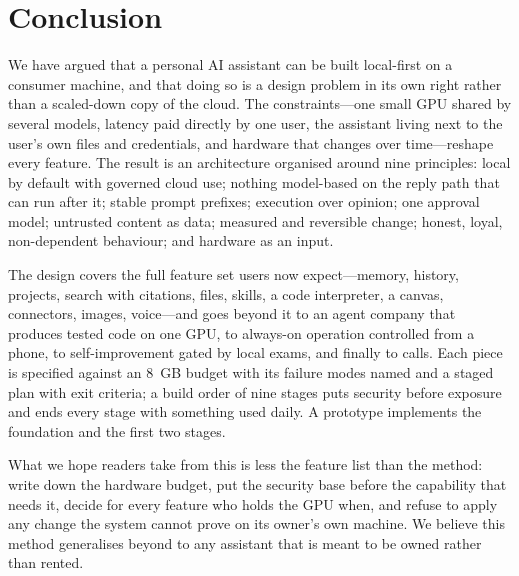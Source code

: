 \section{Conclusion}
\label{sec:conclusion}

We have argued that a personal AI assistant can be built local-first on a consumer machine, and that doing so is a design problem in its own right rather than a scaled-down copy of the cloud. The constraints---one small GPU shared by several models, latency paid directly by one user, the assistant living next to the user's own files and credentials, and hardware that changes over time---reshape every feature. The result is an architecture organised around nine principles: local by default with governed cloud use; nothing model-based on the reply path that can run after it; stable prompt prefixes; execution over opinion; one approval model; untrusted content as data; measured and reversible change; honest, loyal, non-dependent behaviour; and hardware as an input.

The design covers the full feature set users now expect---memory, history, projects, search with citations, files, skills, a code interpreter, a canvas, connectors, images, voice---and goes beyond it to an agent company that produces tested code on one GPU, to always-on operation controlled from a phone, to self-improvement gated by local exams, and finally to calls. Each piece is specified against an 8~GB budget with its failure modes named and a staged plan with exit criteria; a build order of nine stages puts security before exposure and ends every stage with something used daily. A prototype implements the foundation and the first two stages.

What we hope readers take from this is less the feature list than the method: write down the hardware budget, put the security base before the capability that needs it, decide for every feature who holds the GPU when, and refuse to apply any change the system cannot prove on its owner's own machine. We believe this method generalises beyond \hivi{} to any assistant that is meant to be owned rather than rented.
